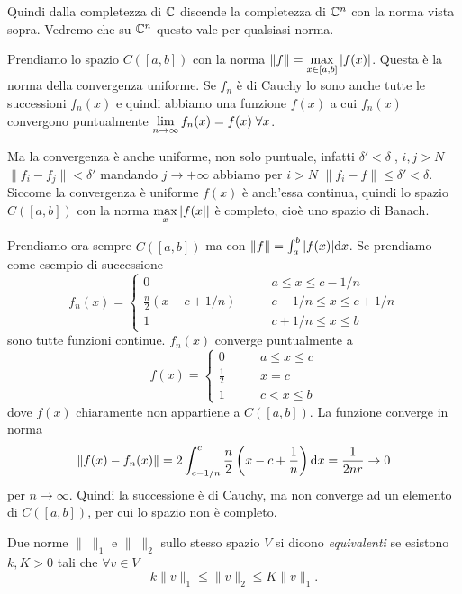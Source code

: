 Quindi dalla completezza di $\mathbb C$ discende la completezza di $\mathbb C^n$ con
la norma vista sopra. Vedremo che su $\mathbb C^n$ questo vale per qualsiasi norma.
\begin{example}
Prendiamo lo spazio $C([a, b])$ con la norma 
$\|f\| = \displaystyle \max_{x \in [a, b]} {\left|f(x)\right|}$.
Questa è la norma della convergenza uniforme. Se $f_n$ è di Cauchy lo sono
anche tutte le successioni $f_n(x)$ e quindi abbiamo una funzione $f(x)$ a
cui $f_n(x)$ convergono puntualmente $\displaystyle \lim_{n \to \infty} f_n(x) = f(x)\;
\forall x$.

Ma la convergenza è anche uniforme, non solo puntuale, infatti 
$\delta' < \delta \;$, $i,j>N$ $\|f_i-f_j\|<\delta'$ mandando $j \to + \infty$
abbiamo per $i>N$ $\|f_i-f\|\leq \delta'<\delta$. Siccome la convergenza è
uniforme $f(x)$ è anch'essa continua, quindi lo spazio $C([a,b])$ con
la norma $\displaystyle \max_{x}{\left|f(x\right|}|$ è completo, cioè uno spazio di Banach.
\end{example}
\begin{example}
	
Prendiamo ora sempre $C([a, b])$ ma con $\|f\| = \int_{a}^b {\left|f(x)\right|} \mathrm{d} x$.
Se prendiamo come esempio di successione
\[
f_n(x)=\begin{cases}
0 \qquad &a\leq x \leq c - 1/n\\
\frac{n}{2}(x - c + 1/n) \qquad &c - 1/n \leq x \leq c + 1/n\\
1 \qquad &c + 1/n \leq x \leq b
\end{cases}
\]
sono tutte funzioni continue. $f_n(x)$ converge puntualmente a
\[
f(x) = \begin{cases}
0 \qquad &a \leq x \leq c\\
\frac{1}{2} \qquad &x = c\\
1 \qquad &c < x \leq b
\end{cases}
\]
dove $f(x)$ chiaramente non appartiene a $C([a, b])$. La funzione converge in norma
\[
\|f(x) - f_n(x)\| = 2\int_{c - 1/n}^c \frac{n}{2} \left(x - c + \frac{1}{n}\right)
\mathrm{d} x = \frac{1}{2nr} \to 0
\]
per $n \to \infty$. Quindi la successione è di Cauchy, ma non converge ad un elemento di
$C([a, b])$, per cui lo spazio non è completo.
\end{example}

\begin{definition}
Due norme $\|\;\|_1$ e $\|\;\|_2$ sullo stesso spazio $V$ si dicono \emph{equivalenti}
se esistono $k, K > 0$ tali che $\forall v \in V$ 
\[
	k\|v\|_1\leq \|v\|_2\leq K\|v\|_1
.\]
\end{definition}

